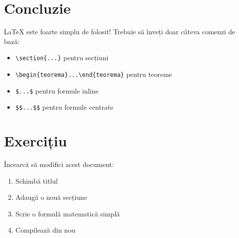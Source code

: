 \documentclass[12pt,a4paper]{article}
\begin{document}
\section{Concluzie}
LaTeX este foarte simplu de folosit! Trebuie să înveți doar câteva comenzi de bază:
\begin{itemize}
\item \texttt{\textbackslash section\{...\}} pentru secțiuni
\item \texttt{\textbackslash begin\{teorema\}...\textbackslash end\{teorema\}} pentru teoreme
\item \texttt{\$...\$} pentru formule inline
\item \texttt{\$\$...\$\$} pentru formule centrate
\end{itemize}

\section{Exercițiu}
Încearcă să modifici acest document:
\begin{enumerate}
\item Schimbă titlul
\item Adaugă o nouă secțiune
\item Scrie o formulă matematică simplă
\item Compilează din nou
\end{enumerate}
\end{document}
